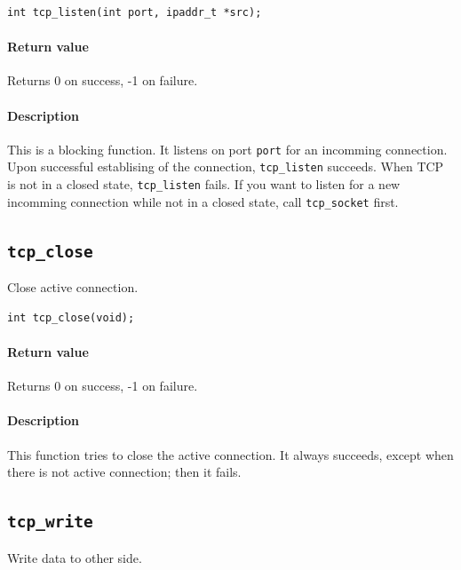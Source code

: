 \documentclass[11pt]{article}
\begin{document}
\begin{lstlisting}
int tcp_listen(int port, ipaddr_t *src);
\end{lstlisting}

\paragraph{Return value}

Returns 0 on success, -1 on failure.

\paragraph{Description}

This is a blocking function. It listens on port \lstinline|port| for an
incomming connection. Upon successful establising of the connection,
\lstinline|tcp_listen| succeeds. When TCP is not in a closed state,
\lstinline|tcp_listen| fails. If you want to listen for a new incomming
connection while not in a closed state, call \lstinline|tcp_socket| first.


\subsection{\lstinline{tcp_close}}

Close active connection.

\begin{lstlisting}
int tcp_close(void);
\end{lstlisting}

\paragraph{Return value}

Returns 0 on success, -1 on failure.

\paragraph{Description}

This function tries to close the active connection. It always succeeds, except
when there is not active connection; then it fails.


\subsection{\lstinline{tcp_write}}

Write data to other side.
\end{document}
